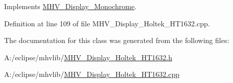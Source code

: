 \-Implements \hyperlink{class_m_h_v___display___monochrome_a58a17e8662802e7f5d6ccd6f0bcc51a0}{\-M\-H\-V\-\_\-\-Display\-\_\-\-Monochrome}.



\-Definition at line 109 of file \-M\-H\-V\-\_\-\-Display\-\_\-\-Holtek\-\_\-\-H\-T1632.\-cpp.



\-The documentation for this class was generated from the following files\-:\begin{DoxyCompactItemize}
\item 
\-A\-:/eclipse/mhvlib/\hyperlink{_m_h_v___display___holtek___h_t1632_8h}{\-M\-H\-V\-\_\-\-Display\-\_\-\-Holtek\-\_\-\-H\-T1632.\-h}\item 
\-A\-:/eclipse/mhvlib/\hyperlink{_m_h_v___display___holtek___h_t1632_8cpp}{\-M\-H\-V\-\_\-\-Display\-\_\-\-Holtek\-\_\-\-H\-T1632.\-cpp}\end{DoxyCompactItemize}
